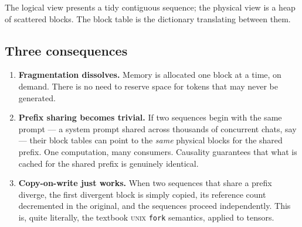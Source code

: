 \documentclass[11pt,a4paper]{article}
\theoremstyle{definition}
\theoremstyle{plain}
\begin{document}
The logical view presents a tidy contiguous sequence; the physical view is a heap of scattered blocks. The block table is the dictionary translating between them.

\begin{center}
\end{center}

\subsection{Three consequences}

\begin{enumerate}[leftmargin=*,itemsep=2pt]
    \item \textbf{Fragmentation dissolves.} Memory is allocated one block at a time, on demand. There is no need to reserve space for tokens that may never be generated.
    \item \textbf{Prefix sharing becomes trivial.} If two sequences begin with the same prompt --- a system prompt shared across thousands of concurrent chats, say --- their block tables can point to the \emph{same} physical blocks for the shared prefix. One computation, many consumers. Causality guarantees that what is cached for the shared prefix is genuinely identical.
    \item \textbf{Copy-on-write just works.} When two sequences that share a prefix diverge, the first divergent block is simply copied, its reference count decremented in the original, and the sequences proceed independently. This is, quite literally, the textbook \textsc{unix} \texttt{fork} semantics, applied to tensors.
\end{enumerate}
\end{document}
